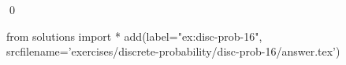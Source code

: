 
\begin{ex} 
  \label{ex:disc-prob-16}
  
  \qed
\end{ex} 
\begin{python0}
from solutions import *
add(label="ex:disc-prob-16",
    srcfilename='exercises/discrete-probability/disc-prob-16/answer.tex') 
\end{python0}
